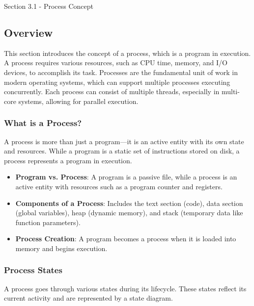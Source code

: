 \begin{notes}{Section 3.1 - Process Concept}
    \subsection*{Overview}

    This section introduces the concept of a process, which is a program in execution. A process requires various resources, such as CPU time, memory, and I/O devices, to accomplish its task. Processes 
    are the fundamental unit of work in modern operating systems, which can support multiple processes executing concurrently. Each process can consist of multiple threads, especially in multi-core 
    systems, allowing for parallel execution.
    
    \subsubsection*{What is a Process?}
    
    A process is more than just a program—it is an active entity with its own state and resources. While a program is a static set of instructions stored on disk, a process represents a program in execution.
    
    \begin{highlight}
    
        \begin{itemize}
            \item \textbf{Program vs. Process}: A program is a passive file, while a process is an active entity with resources such as a program counter and registers.
            \item \textbf{Components of a Process}: Includes the text section (code), data section (global variables), heap (dynamic memory), and stack (temporary data like function parameters).
            \item \textbf{Process Creation}: A program becomes a process when it is loaded into memory and begins execution.
        \end{itemize}
    
    \end{highlight}
    
    \subsubsection*{Process States}
    
    A process goes through various states during its lifecycle. These states reflect its current activity and are represented by a state diagram.
    

\end{notes}
